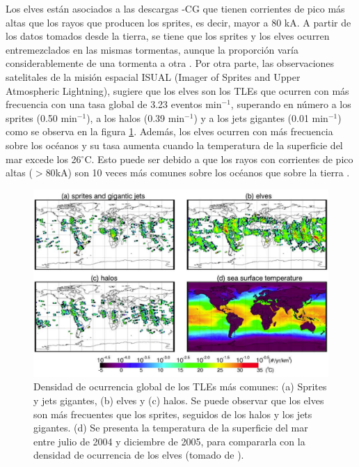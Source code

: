 \documentclass[12pt,oneside,openany,letter]{book}
\begin{document}
Los elves están asociados a las descargas -CG que tienen corrientes de pico más altas que los rayos que producen los sprites, es decir, mayor a 80 kA. A partir de los datos tomados desde la tierra, se tiene que los sprites y los elves ocurren entremezclados en las mismas tormentas, aunque la proporción varía considerablemente de una tormenta a otra \cite{FullekrugEtal2006}. Por otra parte, las observaciones satelitales de la misi\'on espacial ISUAL (Imager of Sprites and Upper Atmospheric Lightning), sugiere que los elves son los TLEs que ocurren con m\'as frecuencia con una tasa global de 3.23 eventos min$^{-1}$, superando en número a los sprites (0.50 min$^{-1}$), a los halos (0.39 min$^{-1}$) y a los jets gigantes (0.01 min$^{-1}$) \cite{chen2008} como se observa en la figura \ref{fig:TLE_global_rate}. Además, los elves ocurren con más frecuencia sobre los océanos y su tasa aumenta cuando la temperatura de la superficie del mar excede los 26$^{\circ}$C. Esto puede ser debido a que los rayos con corrientes de pico altas ($>80$kA) son 10 veces más comunes sobre los océanos que sobre la tierra \cite{chen2008}. 

\begin{figure}
    \centering
    \includegraphics[scale=0.33]{figures/TLE_global_rate.png}
    \caption[Densidad de ocurrencia global de los TLEs m\'as comunes]{Densidad de ocurrencia global de los TLEs m\'as comunes: (a) Sprites y jets gigantes, (b) elves y (c) halos. Se puede observar que los elves son m\'as frecuentes que los sprites, seguidos de los halos y los jets gigantes. (d) Se presenta la temperatura de la superficie del mar entre julio de 2004 y diciembre de 2005, para compararla con la densidad de ocurrencia de los elves (tomado de \cite{chen2008}).}
    \label{fig:TLE_global_rate}
\end{figure}
\end{document}
